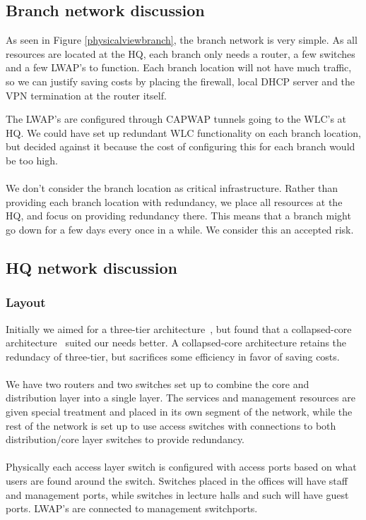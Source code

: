 
\subsection{Branch network discussion}


As seen in Figure \ref{physicalviewbranch}, the branch network is very simple. As all resources are located at the HQ, each branch only needs a router, a few switches and a few LWAP's to function. Each branch location will not have much traffic, so we can justify saving costs by placing the firewall, local DHCP server and the VPN termination at the router itself.

The LWAP's are configured through CAPWAP tunnels going to the WLC's at HQ. We could have set up redundant WLC functionality on each branch location, but decided against it because the cost of configuring this for each branch would be too high.
\\
\\
We don't consider the branch location as critical infrastructure. Rather than providing each branch location with redundancy, we place all resources at the HQ, and focus on providing redundancy there. This means that a branch might go down for a few days every once in a while. We consider this an accepted risk.

\subsection{HQ network discussion}

\subsubsection{Layout}

Initially we aimed for a three-tier architecture~\cite{threetier}, but found that a collapsed-core architecture~\cite{collapsedcore} suited our needs better. A collapsed-core architecture retains the redundacy of three-tier, but sacrifices some efficiency in favor of saving costs.
\\
\\
We have two routers and two switches set up to combine the core and distribution layer into a single layer. The services and management resources are given special treatment and placed in its own segment of the network, while the rest of the network is set up to use access switches with connections to both distribution/core layer switches to provide redundancy.
\\
\\
Physically each access layer switch is configured with access ports based on what users are found around the switch. Switches placed in the offices will have staff and management ports, while switches in lecture halls and such will have guest ports. LWAP's are connected to management switchports.

